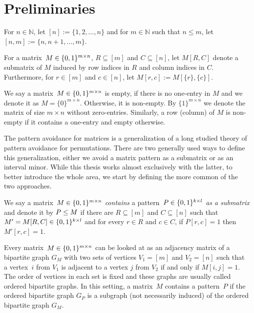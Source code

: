 \section{Preliminaries}
\begin{ntn}
For $n\in\mathbb{N}$, let $[n]:=\{1,2,\dots,n\}$ and for $m\in\mathbb{N}$ such that $n\leq m$, let $[n,m]:=\{n,n+1,\dots,m\}$.
\end{ntn}

\begin{ntn}
For a matrix~$M\in\{0,1\}^{m\times n}$, $R\subseteq[m]$ and $C\subseteq[n]$, let $M[R,C]$ denote a submatrix of $M$ induced by row indices in $R$ and column indices in $C$. Furthermore, for $r\in[m]$ and $c\in[n]$, let $M[r,c]:=M[\{r\},\{c\}]$.
\end{ntn}

\begin{defn}
We say a matrix~$M\in\{0,1\}^{m\times n}$ is empty, if there is no one-entry in $M$ and we denote it as $M=\{0\}^{m\times n}$. Otherwise, it is non-empty. By $\{1\}^{m\times n}$ we denote the matrix of size $m\times n$ without zero-entries. Similarly, a row (column) of $M$ is non-empty if it contains a one-entry and empty otherwise.
\end{defn}

The pattern avoidance for matrices is a generalization of a long studied theory of pattern avoidance for permutations. There are two generally used ways to define this generalization, either we avoid a matrix pattern as a submatrix or as an interval minor. While this thesis works almost exclusively with the latter, to better introduce the whole area, we start by defining the more common of the two approaches.

\begin{defn}
We say a matrix~$M\in\{0,1\}^{m\times n}$ \emph{contains} a pattern~$P\in\{0,1\}^{k\times l}$ \emph{as a submatrix} and denote it by $P\leq M$ if there are $R\subseteq[m]$ and $C\subseteq[n]$ such that $M'=M[R,C]\in\{0,1\}^{k\times l}$ and for every $r\in R$ and $c\in C$, if $P[r,c]=1$ then $M'[r,c]=1$.
\end{defn}

Every matrix~$M\in\{0,1\}^{m\times n}$ can be looked at as an adjacency matrix of a bipartite graph $G_M$ with two sets of vertices $V_1=[m]$ and $V_2=[n]$ such that a vertex~$i$ from $V_1$ is adjacent to a vertex $j$ from $V_2$ if and only if $M[i,j]=1$. The order of vertices in each set is fixed and these graphs are usually called ordered bipartite graphs. In this setting, a matrix~$M$ contains a pattern~$P$ if the ordered bipartite graph $G_P$ is a subgraph (not necessarily induced) of the ordered bipartite graph $G_M$.

